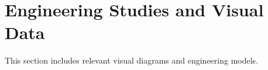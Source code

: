 \documentclass[11pt,a4paper]{article}
\begin{document}
\section{Engineering Studies and Visual Data}
This section includes relevant visual diagrams and engineering models.

\end{document}

